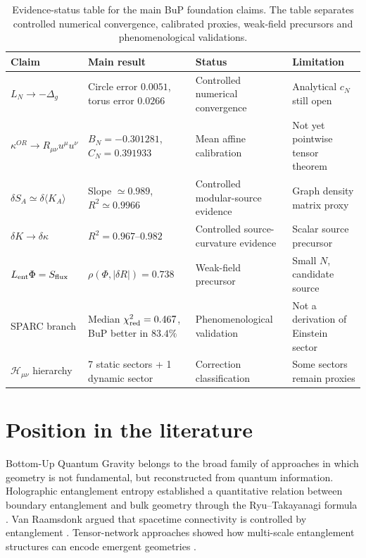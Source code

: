 \documentclass[11pt,a4paper]{article}
\begin{document}
\begin{table}[htbp]
\centering
\small
\begin{tabular}{p{}p{}p{}p{}}
\toprule
Claim & Main result & Status & Limitation \\
\midrule
\(L_N\to-\Delta_g\) &
Circle error \(0.0051\), torus error \(0.0266\) &
Controlled numerical convergence &
Analytical \(c_N\) still open \\

\(\kappa^{OR}\to R_{\mu\nu}u^\mu u^\nu\) &
\(B_N=-0.301281\), \(C_N=0.391933\) &
Mean affine calibration &
Not yet pointwise tensor theorem \\

\(\delta S_A\simeq\delta\langle K_A\rangle\) &
Slope \(\simeq0.989\), \(R^2\simeq0.9966\) &
Controlled modular-source evidence &
Graph density matrix proxy \\

\(\delta K\to\delta\kappa\) &
\(R^2=0.967\)--\(0.982\) &
Controlled source-curvature evidence &
Scalar source precursor \\

\(L_{\rm ent}\Phi=S_{\rm flux}\) &
\(\rho(\Phi,|\delta R|)=0.738\) &
Weak-field precursor &
Small \(N\), candidate source \\

SPARC branch &
Median \(\chi^2_{\rm red}=0.467\), BuP better in \(83.4\%\) &
Phenomenological validation &
Not a derivation of Einstein sector \\

\(\mathcal H_{\mu\nu}\) hierarchy &
7 static sectors + 1 dynamic sector &
Correction classification &
Some sectors remain proxies \\
\bottomrule
\end{tabular}
\caption{
Evidence-status table for the main BuP foundation claims. The table separates
controlled numerical convergence, calibrated proxies, weak-field precursors and
phenomenological validations.
}
\label{tab:evidence-status}
\end{table}

\section{Position in the literature}

Bottom-Up Quantum Gravity belongs to the broad family of approaches in which
geometry is not fundamental, but reconstructed from quantum information.
Holographic entanglement entropy established a quantitative relation between
boundary entanglement and bulk geometry through the Ryu--Takayanagi formula
\cite{RyuTakayanagi2006}. Van Raamsdonk argued that spacetime connectivity is
controlled by entanglement \cite{VanRaamsdonk2010}. Tensor-network approaches
showed how multi-scale entanglement structures can encode emergent geometries
\cite{Swingle2009}.
\end{document}
